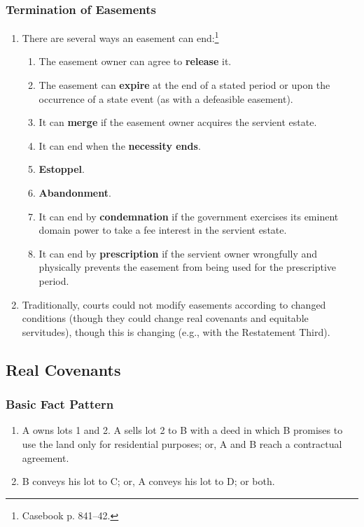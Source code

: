 \subsubsection{Termination of Easements}

\begin{enumerate}
    \item There are several ways an easement can end:\footnote{Casebook p. 
    841--42.}
    \begin{enumerate}
        \item The easement owner can agree to \textbf{release} it.
        \item The easement can \textbf{expire} at the end of a stated period 
        or upon the occurrence of a state event (as with a defeasible 
        easement).
        \item It can \textbf{merge} if the easement owner acquires the 
        servient estate.
        \item It can end when the \textbf{necessity ends}.
        \item \textbf{Estoppel}.
        \item \textbf{Abandonment}.
        \item It can end by \textbf{condemnation} if the government exercises 
        its eminent domain power to take a fee interest in the servient 
        estate.
        \item It can end by \textbf{prescription} if the servient owner 
        wrongfully and physically prevents the easement from being used for 
        the prescriptive period.
    \end{enumerate}
    \item Traditionally, courts could not modify easements according to 
    changed conditions (though they could change real covenants and equitable 
    servitudes), though this is changing (e.g., with the Restatement Third).
\end{enumerate}

\subsection{Real Covenants}

\subsubsection{Basic Fact Pattern}

\begin{enumerate}
    \item A owns lots 1 and 2. A sells lot 2 to B with a deed in which B 
    promises to use the land only for residential purposes; or, A and B reach 
    a contractual agreement.
    \item B conveys his lot to C; or, A conveys his lot to D; or both.
\end{enumerate}

